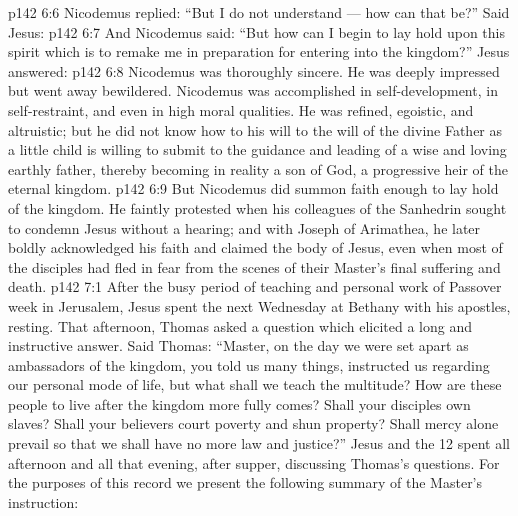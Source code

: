\vs p142 6:6 Nicodemus replied: “But I do not understand --- how can that be?” Said Jesus: 
\vs p142 6:7 And Nicodemus said: “But how can I begin to lay hold upon this spirit which is to remake me in preparation for entering into the kingdom?” Jesus answered: 
\vs p142 6:8 Nicodemus was thoroughly sincere. He was deeply impressed but went away bewildered. Nicodemus was accomplished in self\hyp{}development, in self\hyp{}restraint, and even in high moral qualities. He was refined, egoistic, and altruistic; but he did not know how to  his will to the will of the divine Father as a little child is willing to submit to the guidance and leading of a wise and loving earthly father, thereby becoming in reality a son of God, a progressive heir of the eternal kingdom.
\vs p142 6:9 But Nicodemus did summon faith enough to lay hold of the kingdom. He faintly protested when his colleagues of the Sanhedrin sought to condemn Jesus without a hearing; and with Joseph of Arimathea, he later boldly acknowledged his faith and claimed the body of Jesus, even when most of the disciples had fled in fear from the scenes of their Master’s final suffering and death.
\vs p142 7:1 After the busy period of teaching and personal work of Passover week in Jerusalem, Jesus spent the next Wednesday at Bethany with his apostles, resting. That afternoon, Thomas asked a question which elicited a long and instructive answer. Said Thomas: “Master, on the day we were set apart as ambassadors of the kingdom, you told us many things, instructed us regarding our personal mode of life, but what shall we teach the multitude? How are these people to live after the kingdom more fully comes? Shall your disciples own slaves? Shall your believers court poverty and shun property? Shall mercy alone prevail so that we shall have no more law and justice?” Jesus and the 12 spent all afternoon and all that evening, after supper, discussing Thomas’s questions. For the purposes of this record we present the following summary of the Master’s instruction:
